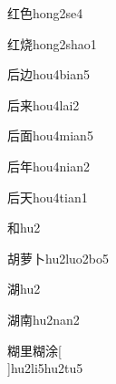 \begin{verbete}[6;6]{红色}{hong2se4}
\end{verbete}

\begin{verbete}[6;10]{红烧}{hong2shao1}
\end{verbete}

\begin{verbete}[6;5]{后边}{hou4bian5}
\end{verbete}

\begin{verbete}[6;7]{后来}{hou4lai2}
\end{verbete}

\begin{verbete}[6;9]{后面}{hou4mian5}
\end{verbete}

\begin{verbete}[6;6]{后年}{hou4nian2}
\end{verbete}

\begin{verbete}[6;4]{后天}{hou4tian1}
\end{verbete}

\begin{verbete}[8]{和}{hu2}
\end{verbete}

\begin{verbete}[9;11;2]{胡萝卜}{hu2luo2bo5}
\end{verbete}

\begin{verbete}[12]{湖}{hu2}
\end{verbete}

\begin{verbete*}[12;9]{湖南}{hu2nan2}
\end{verbete*}

\begin{verbete}[15;7;15;10]{糊里糊涂}[\\]{hu2li5hu2tu5}
\end{verbete}

